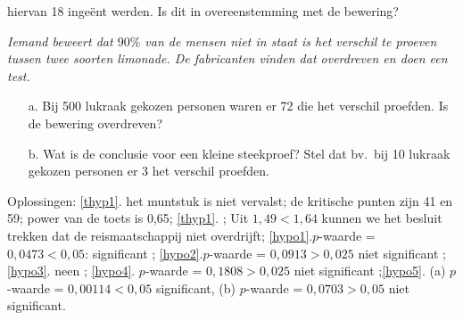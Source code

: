{{\begin{opgave}
hiervan 18 inge\"ent werden. Is dit in overeenstemming met de bewering?
\end{opgave}
\begin{opgave}
\label{hypo5}
\em Iemand beweert dat $90\%$ van de mensen niet in staat is het verschil te 
proeven 
tussen twee soorten limonade. De fabricanten vinden dat overdreven en doen een 
test. 
\begin{itemize}
\item[a.] Bij 500 lukraak gekozen personen waren er 72 die het verschil 
proefden. Is de bewering overdreven?
\item[b.] Wat is de conclusie voor een kleine steekproef? Stel dat bv.\ bij 10 
lukraak gekozen personen er 3 het verschil proefden. 
\end{itemize}
\end{opgave}
{\sc Oplossingen:} \ref{thyp1}.\; het muntstuk is niet vervalst;\; de kritische punten zijn 41 en 59;\; power van de toets is 0,65;\;
\ref{thyp1}.\:
; Uit $1,49< 1,64$ kunnen we het besluit trekken dat de 
reismaatschappij niet overdrijft;\; \ref{hypo1}.\;$p$-waarde = $0,0473<0,05$: significant  ;\; \ref{hypo2}.\;$p$-waarde = $0,0913>0,025$ niet significant ;\;\ref{hypo3}.\; neen ;\; \ref{hypo4}.\; $p$-waarde = $0,1808>0,025$ niet significant ;\;\ref{hypo5}. (a) $p$-waarde = $0,00114<0,05$ significant,\; (b) $p$-waarde = $0,0703>0,05$ niet significant.
}




}

